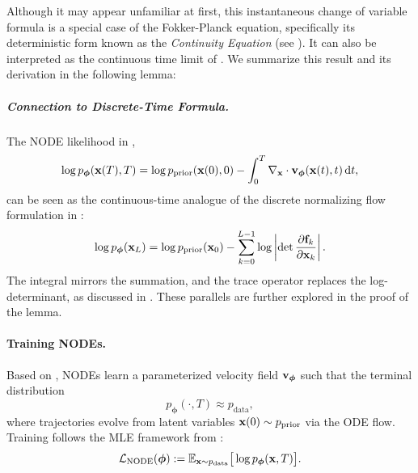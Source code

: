 Although it may appear unfamiliar at first, this instantaneous change of variable formula is a special case of the Fokker-Planck equation, specifically its deterministic form known as the \emph{Continuity Equation} (see ). It can also be interpreted as the continuous time limit of . We summarize this result and its derivation in the following lemma:



\subparagraph{Connection to Discrete-Time Formula.}  
The NODE likelihood in ,
\[
\log p_{\bm{\phi}}({\mathbf{x}}(T), T) = \log p_{\text{prior}}({\mathbf{x}}(0), 0) - \int_0^T \nabla_{\mathbf{x}} \cdot {\mathbf{v}}_{\bm{\phi}}({\mathbf{x}}(t), t) \mathop{}\!\mathrm{d} t,
\]
can be seen as the continuous-time analogue of the discrete normalizing flow formulation in :
\[
\log p_{\bm{\phi}}({\mathbf{x}}_L) = \log p_{\text{prior}}({\mathbf{x}}_0) - \sum_{k=0}^{L-1} \log \left| \det \frac{\partial {\mathbf{f}}_k}{\partial {\mathbf{x}}_k} \right|.
\]
The integral mirrors the summation, and the trace operator replaces the log-determinant, as discussed in . These parallels are further explored in the proof of the lemma.

\paragraph{Training NODEs.}  
Based on , NODEs learn a parameterized velocity field ${\mathbf{v}}_{\bm{\phi}}$ such that the terminal distribution
\[
p_{\bm{\phi}}(\cdot, T) \approx p_{\text{data}},
\]
where trajectories evolve from latent variables ${\mathbf{x}}(0) \sim p_{\text{prior}}$ via the ODE flow. Training follows the MLE framework from :
\[
\mathcal{L}_{\text{NODE}}(\bm{\phi}) := \mathbb{E}_{{\mathbf{x}} \sim p_{\text{data}}} \big[\log p_{\bm{\phi}}({\mathbf{x}}, T)\big].
\]

